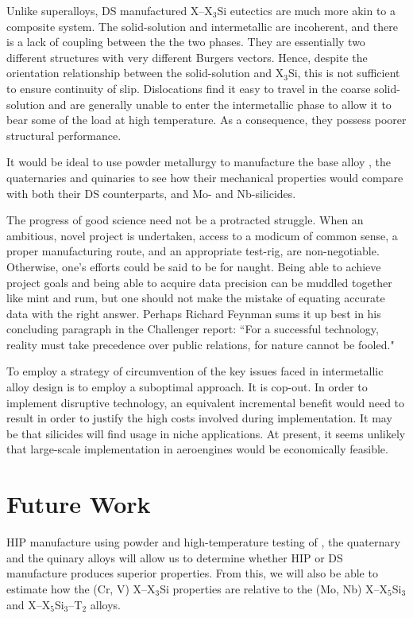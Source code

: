 Unlike superalloys, DS manufactured X--X$_3$Si eutectics are much more akin to a composite system.  The solid-solution and intermetallic are incoherent, and there is a lack of coupling between the the two phases.  They are essentially two different structures with very different Burgers vectors.  Hence, despite the orientation relationship between the solid-solution and X$_3$Si, this is not sufficient to ensure continuity of slip.  Dislocations find it easy to travel in the coarse solid-solution and are generally unable to enter the intermetallic phase to allow it to bear some of the load at high temperature.  As a consequence, they possess poorer structural performance. 

It would be ideal to use powder metallurgy to manufacture the base alloy , the quaternaries and quinaries to see how their mechanical properties would compare with both their DS counterparts, and Mo- and Nb-silicides.

The progress of good science need not be a protracted struggle.  When an ambitious, novel project is undertaken, access to a modicum of common sense, a proper manufacturing route, and an appropriate test-rig, are non-negotiable.  Otherwise, one's efforts could be said to be for naught.  Being able to achieve project goals and being able to acquire data precision can be muddled together like mint and rum, but one should not make the mistake of equating accurate data with the right answer.  Perhaps Richard Feynman sums it up best in his concluding paragraph in the Challenger report: ``For a successful technology, reality must take precedence over public relations, for nature cannot be fooled."

To employ a strategy of circumvention of the key issues faced in intermetallic alloy design is to employ a suboptimal approach.  It is cop-out.  In order to implement disruptive technology, an equivalent incremental benefit would need to result in order to justify the high costs involved during implementation.  It may be that silicides will find usage in niche applications.  At present, it seems unlikely that large-scale implementation in aeroengines would be economically feasible.

 

\section{Future Work}

HIP manufacture using powder and high-temperature testing of , the quaternary and the quinary alloys will allow us to determine whether HIP or DS manufacture produces superior properties.  From this, we will also be able to estimate how the (Cr, V) X--X$_3$Si properties are relative to the (Mo, Nb) X--X$_5$Si$_3$ and X--X$_5$Si$_3$--T$_2$ alloys.

